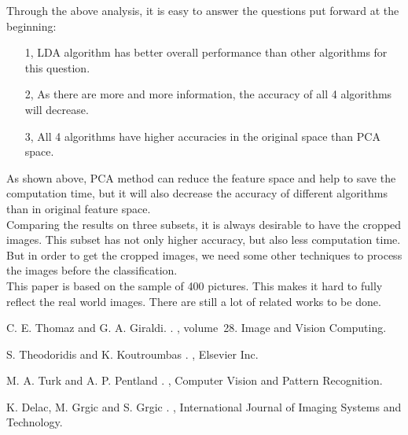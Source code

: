 \documentclass[11pt,letterpaper]{article}
\begin{document}
Through the above analysis, it is easy to answer the questions put forward at the beginning:
\begin{enumerate}
\item[1, ] LDA algorithm has better overall performance than other algorithms for this question.
\item[2, ] As there are more and more information, the accuracy of all 4 algorithms will decrease. 
\item[3, ] All 4 algorithms have higher accuracies in the original space than PCA space.
\end{enumerate}

As shown above, PCA method can reduce the feature space and help to save the computation time, but it will also decrease the accuracy of different algorithms than in original feature space.\\

Comparing the results on three subsets, it is always desirable to have the cropped images. This subset has not only higher accuracy, but also less computation time. But in order to get the cropped images, we need some other techniques to process the images before the classification.\\

This paper is based on the sample of 400 pictures. This makes it hard to fully reflect the real world images. There are still a lot of related works to be done.\\

%
%
\begin{thebibliography}{}

C. E. Thomaz and G. A. Giraldi.
.
, volume~28.
\newblock Image and Vision Computing.

S. Theodoridis and K. Koutroumbas
.
, 
\newblock Elsevier Inc.

M. A. Turk and A. P. Pentland
.
, 
\newblock Computer Vision and Pattern Recognition.

K. Delac, M. Grgic and S. Grgic
.
, 
\newblock International Journal of Imaging Systems and Technology.

\end{thebibliography}
\end{document}

